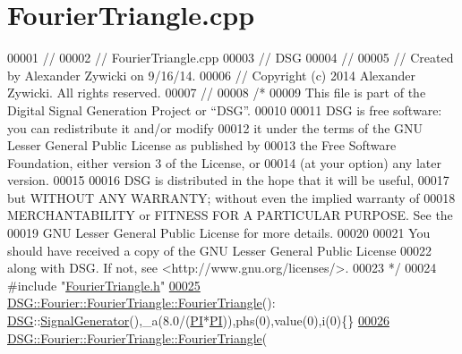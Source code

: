 \hypertarget{_fourier_triangle_8cpp_source}{\section{Fourier\+Triangle.\+cpp}
\label{_fourier_triangle_8cpp_source}
}

\begin{DoxyCode}
00001 \textcolor{comment}{//}
00002 \textcolor{comment}{//  FourierTriangle.cpp}
00003 \textcolor{comment}{//  DSG}
00004 \textcolor{comment}{//}
00005 \textcolor{comment}{//  Created by Alexander Zywicki on 9/16/14.}
00006 \textcolor{comment}{//  Copyright (c) 2014 Alexander Zywicki. All rights reserved.}
00007 \textcolor{comment}{//}
00008 \textcolor{comment}{/*}
00009 \textcolor{comment}{ This file is part of the Digital Signal Generation Project or “DSG”.}
00010 \textcolor{comment}{}
00011 \textcolor{comment}{ DSG is free software: you can redistribute it and/or modify}
00012 \textcolor{comment}{ it under the terms of the GNU Lesser General Public License as published by}
00013 \textcolor{comment}{ the Free Software Foundation, either version 3 of the License, or}
00014 \textcolor{comment}{ (at your option) any later version.}
00015 \textcolor{comment}{}
00016 \textcolor{comment}{ DSG is distributed in the hope that it will be useful,}
00017 \textcolor{comment}{ but WITHOUT ANY WARRANTY; without even the implied warranty of}
00018 \textcolor{comment}{ MERCHANTABILITY or FITNESS FOR A PARTICULAR PURPOSE.  See the}
00019 \textcolor{comment}{ GNU Lesser General Public License for more details.}
00020 \textcolor{comment}{}
00021 \textcolor{comment}{ You should have received a copy of the GNU Lesser General Public License}
00022 \textcolor{comment}{ along with DSG.  If not, see <http://www.gnu.org/licenses/>.}
00023 \textcolor{comment}{ */}
00024 \textcolor{preprocessor}{#include "\hyperlink{_fourier_triangle_8h}{FourierTriangle.h}"}
\hypertarget{_fourier_triangle_8cpp_source_l00025}{}\hyperlink{class_d_s_g_1_1_fourier_1_1_fourier_triangle_a4129c053eddd87256ae39552a06ce329}{00025} \hyperlink{class_d_s_g_1_1_fourier_1_1_fourier_triangle_a4129c053eddd87256ae39552a06ce329}{DSG::Fourier::FourierTriangle::FourierTriangle}():
      \hyperlink{namespace_d_s_g}{DSG}::\hyperlink{class_d_s_g_1_1_signal_generator}{SignalGenerator}(),\_a(8.0/(\hyperlink{_p_i_8h_a598a3330b3c21701223ee0ca14316eca}{PI}*\hyperlink{_p_i_8h_a598a3330b3c21701223ee0ca14316eca}{PI})),phs(0),value(0),i(0)\{\}
\hypertarget{_fourier_triangle_8cpp_source_l00026}{}\hyperlink{class_d_s_g_1_1_fourier_1_1_fourier_triangle_abf887c6f5aada92780224511988cb688}{00026} \hyperlink{class_d_s_g_1_1_fourier_1_1_fourier_triangle_a4129c053eddd87256ae39552a06ce329}{DSG::Fourier::FourierTriangle::FourierTriangle}(

\end{DoxyCode}

